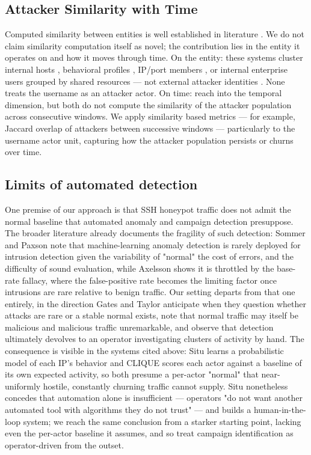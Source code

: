 \documentclass[10pt,twocolumn]{article}   %
\begin{document}
\subsection{Attacker Similarity with Time}
Computed similarity between entities is well established in literature \cite{goodall2018situ, liao2012intelligent, pike2008putting, hao2015ensemble}. We do not claim similarity computation itself as novel; the contribution lies in the entity 
it operates on and how it moves through time. On the entity: these systems cluster internal hosts \cite{goodall2018situ}, behavioral profiles \cite{pike2008putting}, IP/port members \cite{hao2015ensemble}, or  internal enterprise users 
grouped by shared resources — not external attacker identities \cite{liao2012intelligent}. None treats the username as an attacker actor. On time: \cite{pike2008putting, hao2015ensemble} reach into the temporal dimension, 
but both do not compute the similarity of the attacker population across consecutive windows. We apply similarity based metrics — for example, Jaccard overlap of 
attackers between successive windows — particularly to the username actor unit, capturing how the attacker population persists or churns over time.

\subsection{Limits of automated detection}
One premise of our approach is that SSH honeypot traffic does not admit the normal baseline that automated anomaly and campaign detection presuppose. 
The broader literature already documents the fragility of such detection: Sommer and Paxson \cite{sommer2010outside} note that machine-learning anomaly detection 
is rarely deployed for intrusion detection given the variability of "normal" the cost of errors, and the difficulty of sound evaluation, 
while Axelsson \cite{axelsson2000base} shows it is throttled by the base-rate fallacy, where the false-positive rate becomes the limiting factor once 
intrusions are rare relative to benign traffic. Our setting departs from that one entirely, in the direction Gates and Taylor \cite{gates2006challenging} 
anticipate when they question whether attacks are rare or a stable normal exists, note that normal traffic may itself be malicious and malicious traffic 
unremarkable, and observe that detection ultimately devolves to an operator investigating clusters of activity by hand. The consequence is visible in the 
systems cited above: Situ \cite{goodall2018situ} learns a probabilistic model of each IP's behavior and CLIQUE \cite{best2011atypical} scores each actor 
against a baseline of its own expected activity, so both presume a per-actor "normal" that near-uniformly hostile, constantly churning traffic cannot supply. 
Situ nonetheless concedes that automation alone is insufficient — operators "do not want another automated tool with algorithms they do not trust" — and 
builds a human-in-the-loop system; we reach the same conclusion from a starker starting point, lacking even the per-actor baseline it assumes, and so 
treat campaign identification as operator-driven from the outset.
\end{document}
